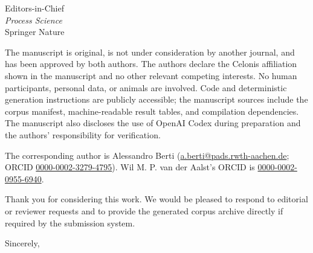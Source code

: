 \documentclass[11pt]{letter}
\begin{document}
\begin{letter}{Editors-in-Chief\\\textit{Process Science}\\Springer Nature}
\newpage

The manuscript is original, is not under consideration by another journal, and has been approved by both authors. The authors declare the Celonis affiliation shown in the manuscript and no other relevant competing interests. No human participants, personal data, or animals are involved. Code and deterministic generation instructions are publicly accessible; the manuscript sources include the corpus manifest, machine-readable result tables, and compilation dependencies. The manuscript also discloses the use of OpenAI Codex during preparation and the authors' responsibility for verification.

The corresponding author is Alessandro Berti (\href{mailto:a.berti@pads.rwth-aachen.de}{a.berti@pads.rwth-aachen.de}; ORCID \href{https://orcid.org/0000-0002-3279-4795}{0000-0002-3279-4795}). Wil M. P. van der Aalst's ORCID is \href{https://orcid.org/0000-0002-0955-6940}{0000-0002-0955-6940}.

Thank you for considering this work. We would be pleased to respond to editorial or reviewer requests and to provide the generated corpus archive directly if required by the submission system.

\closing{Sincerely,}

\end{letter}
\end{document}
